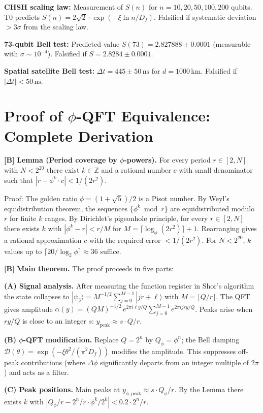 \textbf{CHSH scaling law:} Measurement of $S(n)$ for $n=10,20,50,100,200$ qubits.
T0 predicts $S(n)=2\sqrt2\cdot\exp(-\xi\ln n/D_f)$. Falsified if systematic
deviation $>3\sigma$ from the scaling law.

\textbf{73-qubit Bell test:} Predicted value
$S(73)=2{.}827888\pm0{.}0001$ (measurable with $\sigma\sim10^{-4}$).
Falsified if $S=2{.}8284\pm0{.}0001$.

\textbf{Spatial satellite Bell test:} $\Delta t=445\pm50\,\text{ns}$
for $d=1000\,\text{km}$. Falsified if $|\Delta t|<50\,\text{ns}$.

\section{Proof of \texorpdfstring{$\phi$}{phi}-QFT Equivalence: Complete Derivation}

\textbf{[B]} \textbf{Lemma (Period coverage by $\phi$-powers).} For every period
$r\in[2,N]$ with $N<2^{20}$ there exist $k\in\mathbb Z$ and a rational number $c$
with small denominator such that $|r-\phi^k\cdot c|<1/(2r^2)$.

Proof: The golden ratio $\phi=(1+\sqrt5)/2$ is a Pisot number. By Weyl's
equidistribution theorem, the sequences $\{\phi^k\bmod r\}$ are equidistributed
modulo $r$ for finite $k$ ranges. By Dirichlet's pigeonhole principle, for every
$r\in[2,N]$ there exists $k$ with $|\phi^k-r|<r/M$ for
$M=\lceil\log_\phi(2r^2)\rceil+1$. Rearranging gives a rational approximation $c$
with the required error $<1/(2r^2)$. For $N<2^{20}$, $k$ values up to
$\lceil20/\log_2\phi\rceil\approx36$ suffice.

\textbf{[B]} \textbf{Main theorem.} The proof proceeds in five parts:

\textbf{(A) Signal analysis.} After measuring the function register in Shor's
algorithm the state collapses to
$|\psi_3\rangle = M^{-1/2}\sum_{j=0}^{M-1}|jr+\ell\rangle$ with
$M=\lfloor Q/r\rfloor$. The QFT gives amplitude
$\alpha(y) = (QM)^{-1/2}\,e^{2\pi i\ell y/Q}\sum_{j=0}^{M-1}e^{2\pi ijry/Q}$.
Peaks arise when $ry/Q$ is close to an integer $s$:
$y_\text{peak}\approx s\cdot Q/r$.

\textbf{(B) $\phi$-QFT modification.} Replace $Q=2^n$ by $Q_\phi=\phi^n$; the
Bell damping $\mathcal D(\theta)=\exp(-\xi\theta^2/(\pi^2D_f))$ modifies the
amplitude. This suppresses off-peak contributions (where $\Delta\phi$ significantly
departs from an integer multiple of $2\pi$) and acts as a filter.

\textbf{(C) Peak positions.} Main peaks at
$y_{\phi,\text{peak}}\approx s\cdot Q_\phi/r$. By the Lemma there exists $k$ with
$|Q_\phi/r - 2^n/r\cdot\phi^k/2^k|<0{.}2\cdot2^n/r$.

